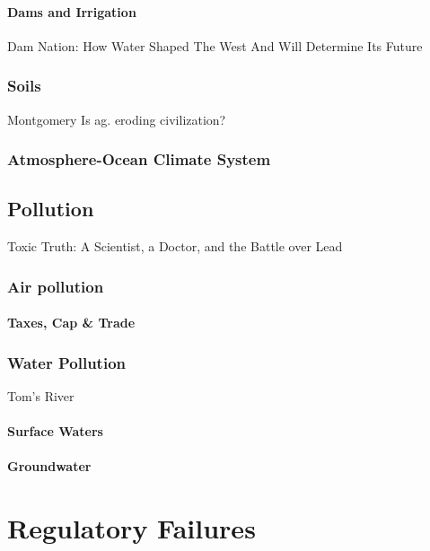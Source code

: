 \documentclass{tufte-book}\usepackage[]{graphicx}\usepackage[]{xcolor}
\begin{document}
\subsection{Dams and Irrigation}

Dam Nation: How Water Shaped The West And Will Determine Its Future

\section{Soils}

Montgomery Is ag. eroding civilization?



\section{Atmosphere-Ocean Climate System}

\chapter{Pollution}

Toxic Truth: A Scientist, a Doctor, and the Battle over Lead

\section{Air pollution}

\subsection{Taxes, Cap \& Trade}



\section{Water Pollution}

Tom's River

\subsection{Surface Waters}

\subsection{Groundwater}




\part{Regulatory Failures}
\end{document}
